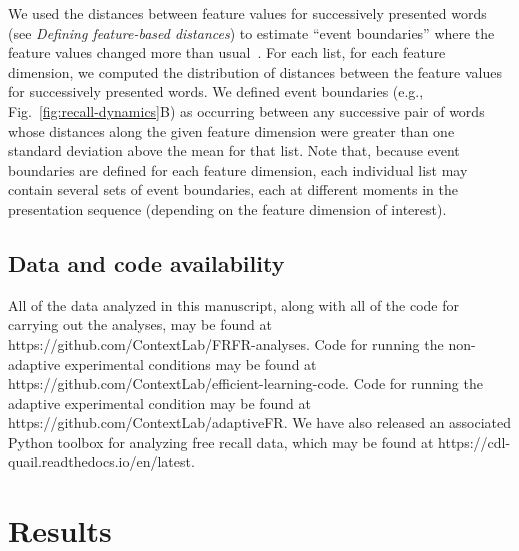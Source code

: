 \documentclass[11pt]{article}
\begin{document}
We used the distances between feature values for successively presented words
(see \textit{Defining feature-based distances}) to estimate ``event
boundaries'' where the feature values changed more than
usual~\citep{EzzyDava11, MannEtal16,RadvCope06, SwalEtal09, SwalEtal11,
DuBrDava16}. For each list, for each feature dimension, we computed the
distribution of distances between the feature values for successively presented
words. We defined event boundaries (e.g., Fig.~\ref{fig:recall-dynamics}B) as
occurring between any successive pair of words whose distances along the given
feature dimension were greater than one standard deviation above the mean for
that list. Note that, because event boundaries are defined for each feature
dimension, each individual list may contain several sets of event boundaries,
each at different moments in the presentation sequence (depending on the
feature dimension of interest).

\subsection*{Data and code availability}

All of the data analyzed in this manuscript, along with all of the code for
carrying out the analyses, may be found at https://github.com/ContextLab/FRFR-analyses.
Code for running the non-adaptive
experimental conditions may be found at
https://github.com/Con\-text\-Lab/efficient-learning-code. Code for running the
adaptive experimental condition may be found at
https://github.com/ContextLab/adaptiveFR. We have also released an associated
Python toolbox for analyzing free recall data, which may be found at
https://cdl-quail.read\-the\-docs.io/\-en/\-latest.

\section*{Results}
\end{document}
